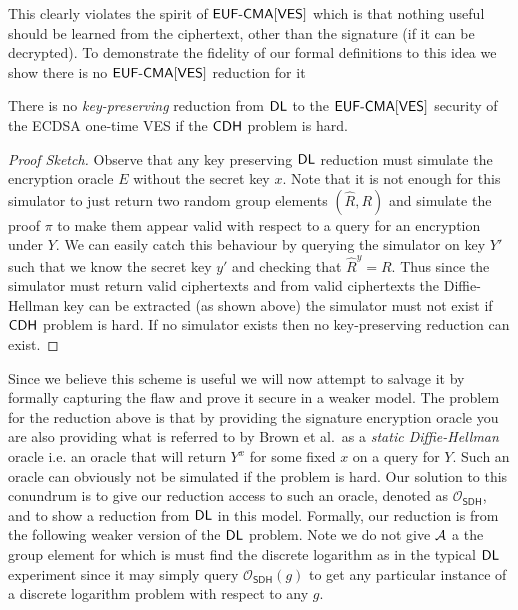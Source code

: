 \newcommand{\SDH}{\textsf{SDH}}
\newcommand{\DLSDH}{\DLOG_{\OSDH}}
\newcommand{\QDLSDH}{\text{-}\DLSDH}
\newcommand{\OSDH}{\mathcal{O}_{\SDH}}


This clearly violates the spirit of $\textsf{EUF-CMA}[\textsf{VES}]$ which is that nothing useful should be learned from the ciphertext, other than the signature (if it can be decrypted).
To demonstrate the fidelity of our formal definitions to this idea we show there is no $\textsf{EUF-CMA}[\textsf{VES}]$ reduction for it

\begin{lemma}
  There is no \emph{key-preserving} reduction from $\textsf{DL}$ to the $\textsf{EUF-CMA}[\textsf{VES}]$ security of the ECDSA one-time VES if the $\textsf{CDH}$ problem is hard.
\end{lemma}
\begin{proof}[Proof Sketch]
  Observe that any key preserving $\textsf{DL}$ reduction must simulate the encryption oracle $E$ without the secret key $x$.
  Note that it is not enough for this simulator to just return two random group elements $(\hat{R}, R)$ and simulate the proof $\pi$ to make them appear valid with respect to a query for an encryption under $Y$.
  We can easily catch this behaviour by querying the simulator on key $Y'$ such that we know the secret key $y'$ and checking that $\hat{R}^y = R$.
  Thus since the simulator must return valid ciphertexts and from valid ciphertexts the Diffie-Hellman key can be extracted (as shown above) the simulator must not exist if $\textsf{CDH}$ problem is hard.
  If no simulator exists then no key-preserving reduction can exist.
\end{proof}


Since we believe this scheme is useful we will now attempt to salvage it by formally capturing the flaw and prove it secure in a weaker model.
The problem for the reduction above is that by providing the signature encryption oracle you are also providing what is referred to by Brown et al.\ as a \emph{static Diffie-Hellman} oracle\cite{SDHP} i.e. an oracle that will return $Y^x$ for some fixed $x$ on a query for $Y$.
Such an oracle can obviously not be simulated if the \CDH problem is hard. %
Our solution to this conundrum is to give our reduction access to such an oracle, denoted as $\OSDH$, and to show a reduction from $\textsf{DL}$ in this model.
Formally, our reduction is from the following weaker version of the $\textsf{DL}$ problem.
Note we do not give $\mathcal{A}$ a the group element for which is must find the discrete logarithm as in the typical $\textsf{DL}$ experiment since it may simply query $\OSDH(g)$ to get any particular instance of a discrete logarithm problem with respect to any $g$.

